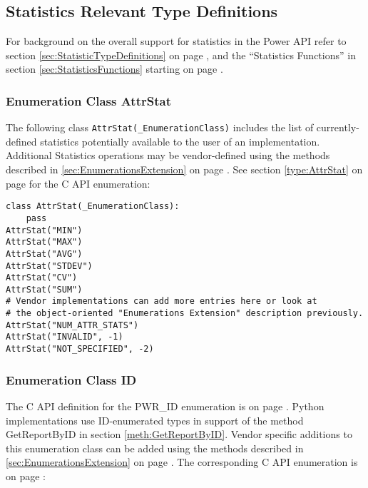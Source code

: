 \documentclass[12pt]{report} %
\begin{document}
\begin{appendices}
\subsection{Statistics Relevant Type Definitions}
\label{sec:PythonStatisticsRelevantTypeDefinitions}

For background on the overall support for statistics in the Power API refer to
section \ref{sec:StatisticTypeDefinitions} on page
\pageref{sec:StatisticTypeDefinitions}, and  the ``Statistics Functions'' in
section \ref{sec:StatisticsFunctions} starting on page
\pageref{sec:StatisticsFunctions}.

\subsubsection{Enumeration Class AttrStat}\label{class:AttrStat}

The following class \texttt{AttrStat(_EnumerationClass)} includes the list of
currently-defined statistics potentially available to the user of an
implementation. Additional Statistics operations may be vendor-defined using
the methods described in \ref{sec:EnumerationsExtension} on page
\pageref{sec:EnumerationsExtension}. See section \ref{type:AttrStat} on page
\pageref{type:AttrStat} for the C API enumeration:

\begin{center}\begin{minipage}{.95\linewidth}\begin{lstlisting}
class AttrStat(_EnumerationClass):
    pass
AttrStat("MIN")
AttrStat("MAX")
AttrStat("AVG")
AttrStat("STDEV")
AttrStat("CV")
AttrStat("SUM")
# Vendor implementations can add more entries here or look at  
# the object-oriented "Enumerations Extension" description previously. 
AttrStat("NUM_ATTR_STATS")
AttrStat("INVALID", -1)
AttrStat("NOT_SPECIFIED", -2)
\end{lstlisting}\end{minipage}\end{center}

\subsubsection{Enumeration Class ID}\label{class:ID}

The C API definition for the PWR_ID enumeration is on page \pageref{type:ID}.
Python implementations use ID-enumerated types in support of the method
GetReportByID in section \ref{meth:GetReportByID}. Vendor specific additions to
this enumeration class can be added using the methods described in
\ref{sec:EnumerationsExtension} on page \pageref{sec:EnumerationsExtension}.
The corresponding C API enumeration is on page \pageref{type:ID}:


\end{appendices}
\end{document}
